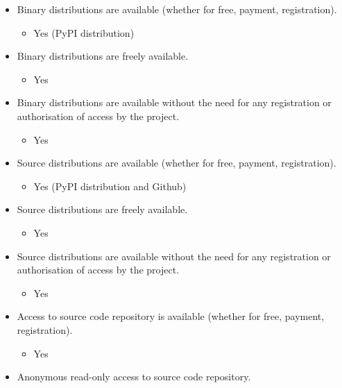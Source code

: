 \begin{itemize}
\itemsep1pt\parskip0pt
\item
  Binary distributions are available (whether for free, payment,
  registration).

  \begin{itemize}
  \itemsep1pt\parskip0pt
  \item
    Yes (PyPI distribution)
  \end{itemize}
\item
  Binary distributions are freely available.

  \begin{itemize}
  \itemsep1pt\parskip0pt
  \item
    Yes
  \end{itemize}
\item
  Binary distributions are available without the need for any
  registration or authorisation of access by the project.

  \begin{itemize}
  \itemsep1pt\parskip0pt
  \item
    Yes
  \end{itemize}
\item
  Source distributions are available (whether for free, payment,
  registration).

  \begin{itemize}
  \itemsep1pt\parskip0pt
  \item
    Yes (PyPI distribution and Github)
  \end{itemize}
\item
  Source distributions are freely available.

  \begin{itemize}
  \itemsep1pt\parskip0pt
  \item
    Yes
  \end{itemize}
\item
  Source distributions are available without the need for any
  registration or authorisation of access by the project.

  \begin{itemize}
  \itemsep1pt\parskip0pt
  \item
    Yes
  \end{itemize}
\item
  Access to source code repository is available (whether for free,
  payment, registration).

  \begin{itemize}
  \itemsep1pt\parskip0pt
  \item
    Yes
  \end{itemize}
\item
  Anonymous read-only access to source code repository.


\end{itemize}
